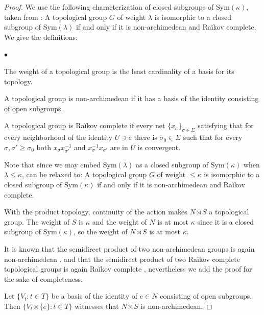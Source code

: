 \documentclass[11pt]{amsart}
\theoremstyle{plain}
\theoremstyle{definition}
\begin{document}
\begin{proof}
    We use the following characterization of closed subgroups of $\mathrm{Sym}(\kappa)$, taken from \cite[Corollary 4.9]{ClosedofSym}: A topological group $G$ of weight $\lambda$ is isomorphic to a closed subgroup of $\mathrm{Sym}(\lambda)$ if and only if it is non-archimedean and Ra\u{i}kov complete. We give the definitions:
    \begin{list}{$\bullet$}{}
        \item The weight of a topological group is the least cardinality of a basis for its topology.
        \item A topological group is non-archimedean if it has a basis of the identity consisting of open subgroups.
        \item A topological group is Ra\u{i}kov complete if every net $\{x_\sigma\}_{\sigma\in \Sigma}$ satisfying that for every neighborhood of the identity $U\ni e$ there is $\sigma_0\in \Sigma$ such that for every $\sigma,\sigma'\geq \sigma_0$ both $x_\sigma x_{\sigma'}^{-1}$ and $x_{\sigma}^{-1}x_{\sigma'}$ are in $U$ is convergent.
    \end{list}

    Note that since we may embed $\mathrm{Sym}(\lambda)$ as a closed subgroup of $\mathrm{Sym}(\kappa)$ when $\lambda\leq \kappa$, \cite[Corollary 4.9]{ClosedofSym} can be relaxed to: A topological group $G$ of weight $\leq \kappa$ is isomorphic to a closed subgroup of $\mathrm{Sym}(\kappa)$ if and only if it is non-archimedean and Ra\u{i}kov complete.

    With the product topology, continuity of the action makes $N\rtimes S$ a topological group. 
    The weight of $S$ is $\kappa$ and the weight of $N$ is at most $\kappa$ since it is a closed subgroup of $\mathrm{Sym}(\kappa)$, so the weight of $N\rtimes S$ is at most $\kappa$.

    It is known that the semidirect product of two non-archimedean groups is again non-archimedean \cite[Corollary 3.4]{MeSh}. and that the semidirect product of two Ra\u{i}kov complete topological groups is again Ra\u{i}kov complete \cite[Theorems 12,17]{raikov}, nevertheless we add the proof for the sake of completeness.

    Let $\{V_t:t\in T\}$ be a basis of the identity of $e\in N$ consisting of open subgroups. Then $\{V_t\rtimes \{e\}:t\in T\}$ witnesses that $N\rtimes S$ is non-archimedean.
    

\end{proof}
\end{document}
